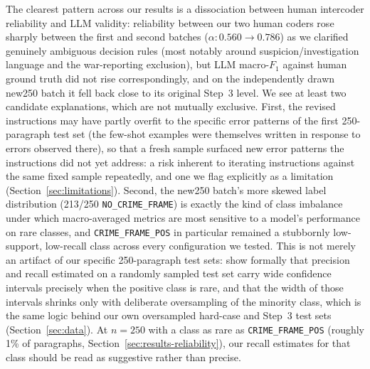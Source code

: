 \documentclass[a4paper,oneside,bibliography=totoc]{scrartcl}
\begin{document}
The clearest pattern across our results is a dissociation between human intercoder reliability and LLM validity: reliability between our two human coders rose sharply between the first and second batches ($\alpha: 0.560 \rightarrow 0.786$) as we clarified genuinely ambiguous decision rules (most notably around suspicion/investigation language and the war-reporting exclusion), but LLM macro-$F_1$ against human ground truth did not rise correspondingly, and on the independently drawn new250 batch it fell back close to its original Step~3 level. We see at least two candidate explanations, which are not mutually exclusive. First, the revised instructions may have partly overfit to the specific error patterns of the first 250-paragraph test set (the few-shot examples were themselves written in response to errors observed there), so that a fresh sample surfaced new error patterns the instructions did not yet address: a risk inherent to iterating instructions against the same fixed sample repeatedly, and one we flag explicitly as a limitation (Section~\ref{sec:limitations}). Second, the new250 batch's more skewed label distribution (213/250 \texttt{NO\_CRIME\_FRAME}) is exactly the kind of class imbalance under which macro-averaged metrics are most sensitive to a model's performance on rare classes, and \texttt{CRIME\_FRAME\_POS} in particular remained a stubbornly low-support, low-recall class across every configuration we tested. This is not merely an artifact of our specific 250-paragraph test sets: \citet{shang2023} show formally that precision and recall estimated on a randomly sampled test set carry wide confidence intervals precisely when the positive class is rare, and that the width of those intervals shrinks only with deliberate oversampling of the minority class, which is the same logic behind our own oversampled hard-case and Step~3 test sets (Section~\ref{sec:data}). At $n=250$ with a class as rare as \texttt{CRIME\_FRAME\_POS} (roughly 1\% of paragraphs, Section~\ref{sec:results-reliability}), our recall estimates for that class should be read as suggestive rather than precise.
\end{document}
